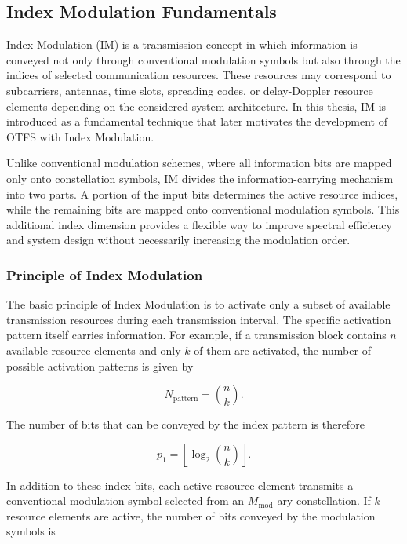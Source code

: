 \subsection{Index Modulation Fundamentals}

Index Modulation (IM) is a transmission concept in which information is conveyed not only through conventional modulation symbols but also through the indices of selected communication resources. These resources may correspond to subcarriers, antennas, time slots, spreading codes, or delay-Doppler resource elements depending on the considered system architecture. In this thesis, IM is introduced as a fundamental technique that later motivates the development of OTFS with Index Modulation.

Unlike conventional modulation schemes, where all information bits are mapped only onto constellation symbols, IM divides the information-carrying mechanism into two parts. A portion of the input bits determines the active resource indices, while the remaining bits are mapped onto conventional modulation symbols. This additional index dimension provides a flexible way to improve spectral efficiency and system design without necessarily increasing the modulation order.

\subsubsection{Principle of Index Modulation}

The basic principle of Index Modulation is to activate only a subset of available transmission resources during each transmission interval. The specific activation pattern itself carries information. For example, if a transmission block contains \(n\) available resource elements and only \(k\) of them are activated, the number of possible activation patterns is given by

\begin{equation}
N_{\mathrm{pattern}} = \binom{n}{k}.
\end{equation}

The number of bits that can be conveyed by the index pattern is therefore

\begin{equation}
p_1 = \left\lfloor \log_2 \binom{n}{k} \right\rfloor.
\end{equation}

In addition to these index bits, each active resource element transmits a conventional modulation symbol selected from an \(M_{\mathrm{mod}}\)-ary constellation. If \(k\) resource elements are active, the number of bits conveyed by the modulation symbols is

